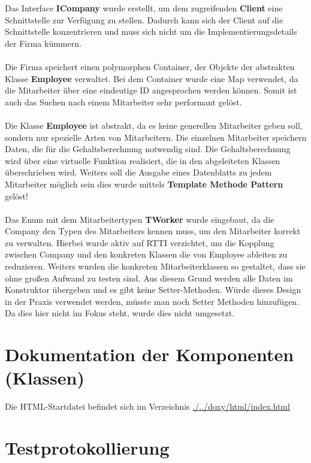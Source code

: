 \documentclass[12pt,naustrian,a4widepaper]{scrartcl}
\begin{document}
Das Interface \textbf{ICompany} wurde erstellt, um dem zugreifenden \textbf{Client} eine Schnittstelle zur Verfügung zu stellen.
Dadurch kann sich der Client auf die Schnittstelle konzentrieren und muss sich nicht um die Implementierungsdetails der Firma kümmern.
\\
\\
Die Firma speichert einen polymorphen Container, der Objekte der abstrakten Klasse \textbf{Employee} verwaltet.
Bei dem Container wurde eine Map verwendet, da die Mitarbeiter über eine eindeutige ID angesprochen werden können.
Somit ist auch das Suchen nach einem Mitarbeiter sehr performant gelöst.
\\
\\
Die Klasse \textbf{Employee} ist abstrakt, da es keine generellen Mitarbeiter geben soll, sondern nur spezielle Arten von Mitarbeitern.
Die einzelnen Mitarbeiter speichern Daten, die für die Gehaltsberechnung notwendig sind. 
Die Gehaltsberechnung wird über eine virtuelle Funktion realisiert, die in den abgeleiteten Klassen überschrieben wird.
Weiters soll die Ausgabe eines Datenblatts zu jedem Mitarbeiter möglich sein dies wurde mittels \textbf{Template Methode Pattern} gelöst!
\\
\\
Das Enum mit dem Mitarbeitertypen \textbf{TWorker} wurde eingebaut, da die Company den Typen des Mitarbeiters kennen muss, um den Mitarbeiter korrekt zu verwalten.
Hierbei wurde aktiv auf RTTI verzichtet, um die Kopplung zwischen Company und den konkreten Klassen die von Employee ableiten zu reduzieren.
Weiters wurden die konkreten Mitarbeiterklassen so gestaltet, dass sie ohne großen Aufwand zu testen sind.
Aus diesem Grund werden alle Daten im Konstruktor übergeben und es gibt keine Setter-Methoden.
Würde dieses Design in der Praxis verwendet werden, müsste man noch Setter Methoden hinzufügen.
Da dies hier nicht im Fokus steht, wurde dies nicht umgesetzt.\\
\color{black}

\section{Dokumentation der Komponenten (Klassen)}
Die HTML-Startdatei befindet sich im Verzeichnis \href{run:./../doxy/html/index.html}{./../doxy/html/index.html}


\clearpage
\section{Testprotokollierung}

\end{document}
